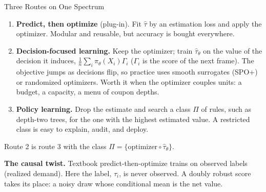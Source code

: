 \documentclass[aspectratio=169, 11pt, handout]{beamer}
\newcommand{\hatt}{\hat{\tau}}
\begin{document}
\begin{frame}{Three Routes on One Spectrum}

\begin{enumerate}
  \item \textbf{Predict, then optimize} (plug-in). Fit $\hatt$ by an estimation loss and apply the optimizer. Modular and reusable, but accuracy is bought everywhere.
  \item \textbf{Decision-focused learning.} Keep the optimizer; train $\hatt_\theta$ on the value of the decision it induces, $\frac1n\sum_i \pi_\theta(X_i)\Gamma_i$ ($\Gamma_i$ is the score of the next frame). The objective jumps as decisions flip, so practice uses smooth surrogates (SPO+) or randomized optimizers. Worth it when the optimizer couples units: a budget, a capacity, a menu of coupon depths.
  \item \textbf{Policy learning.} Drop the estimate and search a class $\Pi$ of rules, such as depth-two trees, for the one with the highest estimated value. A restricted class is easy to explain, audit, and deploy.
\end{enumerate}

\medskip

Route 2 is route 3 with the class $\Pi = \{\text{optimizer} \circ \hatt_\theta\}$.

\medskip

\textbf{The causal twist.} Textbook predict-then-optimize trains on observed labels (realized demand). Here the label, $\tau_i$, is never observed. A doubly robust score takes its place: a noisy draw whose conditional mean is the net value.
\end{frame}
\end{document}
